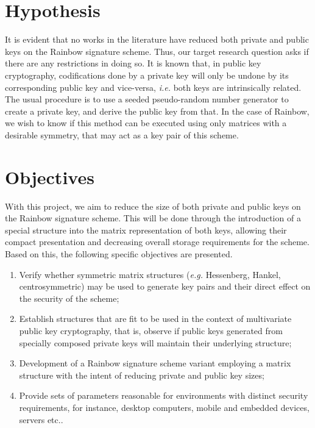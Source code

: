 \documentclass[10pt]{article}
\begin{document}
\section{Hypothesis}

It is evident that no works in the literature have reduced both private and
public keys on the Rainbow signature scheme. Thus, our target research question
asks if there are any restrictions in doing so. It is known that, in public key
cryptography, codifications done by a private key will only be undone by its
corresponding public key and vice-versa, \emph{i.e.} both keys are
intrinsically related. The usual procedure is to use a seeded pseudo-random
number generator to create a private key, and derive the public key from that.
In the case of Rainbow, we wish to know if this method can be executed using
only matrices with a desirable symmetry, that may act as a key pair of this
scheme.

\section{Objectives}

With this project, we aim to reduce the size of both private and public keys on
the Rainbow signature scheme. This will be done through the introduction of a
special structure into the matrix representation of both keys, allowing their
compact presentation and decreasing overall storage requirements for the
scheme. Based on this, the following specific objectives are presented.

\begin{enumerate}[label=\alph*.]
  \item Verify whether symmetric matrix structures (\emph{e.g.} Hessenberg,
      Hankel, centrosymmetric) may be used to generate key pairs and their
      direct effect on the security of the scheme;
  \item Establish structures that are fit to be used in the context of
      multivariate public key cryptography, that is, observe if public keys
      generated from specially composed private keys will maintain their
      underlying structure;
  \item Development of a Rainbow signature scheme variant employing a matrix
      structure with the intent of reducing private and public key sizes;
  \item Provide sets of parameters reasonable for environments with distinct
      security requirements, for instance, desktop computers, mobile and
      embedded devices, servers etc..
\end{enumerate}
\end{document}
